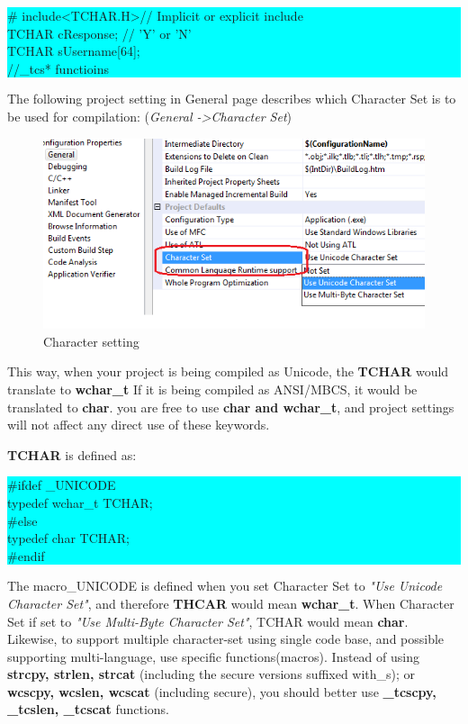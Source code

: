	\colorbox{cyan}{\parbox{0.9\linewidth}{
			\# include\textless TCHAR.H\textgreater //
			Implicit or explicit include \\ TCHAR cResponse; //
			'Y' or 'N' \\
			TCHAR sUsername[64];\\
			//\_tcs* functioins}}
	
	The following project setting in General page describes which Character Set is to be used for compilation: (\textit{General -\textgreater Character Set})
	
	\begin{figure}
		\centering
		\includegraphics[width=0.7\linewidth]{TCHARWCHARLPSTR}
		\caption{Character setting}
		\label{fig:TCHARWCHARLPSTR}
	\end{figure}
	
	
	This way, when your project is being compiled as Unicode, the \textbf{TCHAR} would translate to \textbf{wchar\_t}  If it is being compiled as ANSI/MBCS, it would be translated to \textbf{char}. you are free to use \textbf{char and wchar\_t}, and project settings will not affect any direct use of these keywords.
	
	\textbf{TCHAR} is defined as:
	
	\colorbox{cyan}{\parbox{0.9\linewidth}{
			\#ifdef \_UNICODE\\
			typedef wchar\_t TCHAR;\\
			\#else\\
			typedef char TCHAR;\\
			\#endif}}
	
	The macro\_UNICODE is defined when you set Character Set to \textit{"Use Unicode Character Set"}, and therefore \textbf{THCAR} would mean \textbf{wchar\_t}. When Character Set if set to \textit{"Use Multi-Byte Character Set"}, TCHAR would mean \textbf{char}.\\
	
	Likewise, to support multiple character-set using single code base, and possible supporting multi-language, use specific functions(macros). Instead of using \textbf{strcpy, strlen, strcat} (including the secure versions suffixed with\_s); or \textbf{wcscpy, wcslen, wcscat} (including secure), you should better use \textbf{\_tcscpy, \_tcslen, \_tcscat} functions.\\
	
